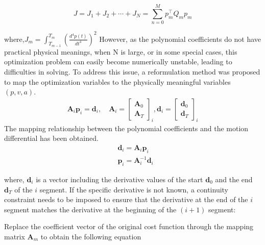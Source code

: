 \documentclass[conference]{IEEEtran}
\begin{document}
    \begin{equation}
        J= J_{1}+J_{2}+\cdots+J_{N} = \sum_{n=0}^M p_{m}^\top Q_{m}p_{m}
    \end{equation}

    where,$J_{m} = \int^{T_{m}}_{{T_{m-1}}}\left( \frac{d^4p(t)}{dt^4} \right)^2$
    However, as the polynomial coefficients do not have practical physical meanings, when N is large, or in some special cases, this optimization problem can easily become numerically unstable, leading to difficulties in solving. To address this issue, a reformulation method was proposed to map the optimization variables to the physically meaningful variables $(p,v,a)$\cite{b8}.
    \begin{equation}
        \begin{aligned}
            \boldsymbol{A}_i\boldsymbol{p}_i=\boldsymbol{d}_i,\quad \boldsymbol{A}_i=\begin{bmatrix}\boldsymbol{A}_0\\\boldsymbol{A}_T\end{bmatrix}_i,\boldsymbol{d}_i=\begin{bmatrix}\boldsymbol{d}_0\\\boldsymbol{d}_T\end{bmatrix}_i
        \end{aligned}
    \end{equation}
    The mapping relationship between the polynomial coefficients and the motion differential has been obtained.
    \begin{equation}
        \begin{aligned}
            & \boldsymbol{d}_{i}
            = 
            \boldsymbol{A}_{i} 
            \boldsymbol{p}_{i} \\
            & \boldsymbol{p}_{i} = \boldsymbol{A}_{i}^{-1}\boldsymbol{d}_{i}
        \end{aligned}
    \end{equation}

    where, $\boldsymbol{d}_{i}$ is a vector including the derivative values of the start $\boldsymbol{d}_0$ and the end $\boldsymbol{d}_T$ of the $i$ segment. If the specific derivative is not known, a continuity constraint needs to be imposed to ensure that the derivative at the end of the $i$ segment matches the derivative at the beginning of the $(i + 1)$ segment: 

    Replace the coefficient vector of the original cost function through the mapping matrix $\boldsymbol{A}_{m}$ to obtain the following equation
\end{document}
